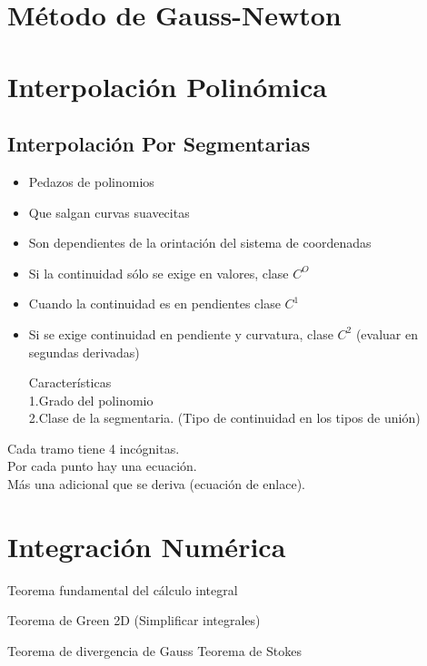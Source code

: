 \section{M\'etodo de Gauss-Newton}

\section{Interpolaci\'on Polin\'omica}
\subsection{Interpolaci\'on Por Segmentarias}
\begin{itemize}
\item Pedazos de polinomios
\item Que salgan curvas suavecitas
\item Son dependientes de la orintaci\'on del sistema de coordenadas

\item Si la continuidad s\'olo se exige en valores, clase $C^O$
\item Cuando la continuidad es en pendientes clase $C^1$

\item Si se exige continuidad en pendiente y curvatura, clase $C^2$ (evaluar en segundas derivadas)

Caracter\'isticas\\
1.Grado del polinomio\\
2.Clase de la segmentaria. (Tipo de continuidad en los tipos de uni\'on)
\end{itemize}

Cada tramo tiene 4 inc\'ognitas.\\
Por cada punto hay una ecuaci\'on.\\
M\'as una adicional que se deriva (ecuaci\'on de enlace).

\section{Integraci\'on Num\'erica}

Teorema fundamental del c\'alculo integral

Teorema de Green 2D (Simplificar integrales)

Teorema de divergencia de Gauss
Teorema de Stokes


